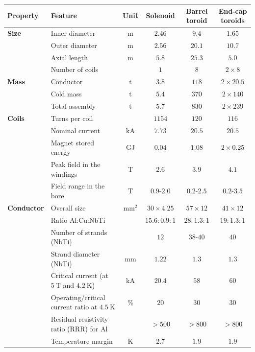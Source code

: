 \begin{table}[htbp]
	\centering
	\scriptsize
	\begin{tabular}{|l|l|c|c|c|c|}
		\hline
		\textbf{Property} & \textbf{Feature} & \textbf{Unit} & \textbf{Solenoid} & \textbf{Barrel toroid} & \textbf{End-cap toroids} \\
		\hline
		\textbf{Size} & Inner diameter & m & $2.46$ & $9.4$ & $1.65$ \\
		\hline
		 & Outer diameter & m & $2.56$ & $20.1$ & $10.7$ \\
		\hline
		 & Axial length & m & $5.8$ & $25.3$ & $5.0$ \\
		\hline
		 & Number of coils & & $1$ & $8$ & $2\times 8$ \\
		\hline
		\textbf{Mass} & Conductor & t & $3.8$ & $118$ & $2\times 20.5$ \\
		\hline
		 & Cold mass & t & $5.4$ & $370$ & $2\times 140$ \\
		\hline
		 & Total assembly & t & $5.7$ & $830$ & $2\times 239$ \\
		\hline
		\textbf{Coils} & Turns per coil & & $1154$ & $120$ & $116$ \\
		\hline
		 & Nominal current & kA & $7.73$ & $20.5$ & $20.5$ \\
		\hline
		 & Magnet stored energy & GJ & $0.04$ & $1.08$ & $2\times 0.25$ \\
		\hline
		 & Peak field in the windings & T & $2.6$ & $3.9$ & $4.1$ \\
		\hline
		 & Field range in the bore & T & $0.9$-$2.0$ & $0.2$-$2.5$ & $0.2$-$3.5$ \\
		\hline
		\textbf{Conductor} & Overall size & mm$^2$ & $30\times 4.25$ & $57\times12$ & $41\times 12$ \\
		\hline
		 & Ratio Al:Cu:NbTi & & $15.6:0.9:1$ & $28:1.3:1$ & $19:1.3:1$ \\
		\hline
		 & Number of strands (NbTi) & & $12$ & $38$-$40$ & $40$ \\
		\hline
		 & Strand diameter (NbTi) & mm & $1.22$ & $1.3$ & $1.3$ \\
		\hline
		 & Critical current (at $5~\mbox{T}$ and $4.2~\mbox{K}$) & kA & $20.4$ & $58$ & $60$ \\
		\hline
		 & Operating/critical current ratio at $4.5~\mbox{K}$ & \% & $20$ & $30$ & $30$ \\
		\hline
		 & Residual resistivity ratio (RRR) for Al & & $>500$ & $>800$ & $>800$ \\
		\hline
		 & Temperature margin & K & $2.7$ & $1.9$ & $1.9$ \\

\end{tabular}
\end{table}
